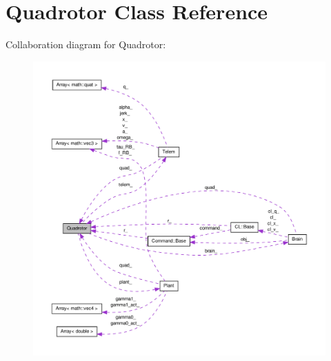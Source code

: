 \hypertarget{classQuadrotor}{\section{\-Quadrotor \-Class \-Reference}
\label{classQuadrotor}
}


\-Collaboration diagram for \-Quadrotor\-:\nopagebreak
\begin{figure}[H]
\begin{center}
\leavevmode
\includegraphics[width=350pt]{classQuadrotor__coll__graph}
\end{center}
\end{figure}
